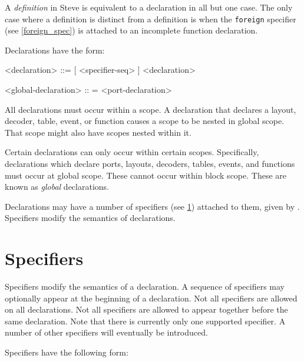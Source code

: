A \textit{definition} in Steve is equivalent to a declaration in all but one case. The only case where a definition is distinct from a definition is when the \texttt{foreign} specifier (see \ref{foreign_spec}) is attached to an incomplete function declaration.

Declarations have the form:

\begin{minip}
\begin{grammar}
<declaration> ::=
[ <specifier-seq> ] <declaration>

<global-declaration> :: =
<port-declaration>
\end{grammar}
\end{minip}

All declarations must occur within a scope. A declaration that declares a layout, decoder, table, event, or function causes a scope to be nested in global scope. That scope might also have scopes nested within it.

Certain declarations can only occur within certain scopes. Specifically, declarations which declare ports, layouts, decoders, tables, events, and functions must occur at global scope. These cannot occur within block scope. These are known as \textit{global} declarations.

Declarations may have a number of specifiers (see \ref{spec_guide}) attached to them, given by . Specifiers modify the semantics of declarations.

\section{Specifiers} \label{spec_guide}

Specifiers modify the semantics of a declaration. A sequence of specifiers may optionally appear at the beginning of a declaration. Not all specifiers are allowed on all declarations. Not all specifiers are allowed to appear together before the same declaration. Note that there is currently only one supported specifier. A number of other specifiers will eventually be introduced.

Specifiers have the following form:

